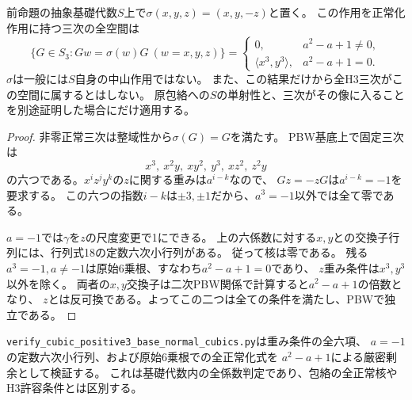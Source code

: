 \begin{proposition}\label{prop:h3-positive3-base-normal-cubics}
前命題の抽象基礎代数$S$上で$\sigma(x,y,z)=(x,y,-z)$と置く。
この作用を正常化作用に持つ三次の全空間は
\[
 \{G\in S_3:Gw=\sigma(w)G\ (w=x,y,z)\}
 =\begin{cases}
 0,&a^2-a+1\ne0,\\
 \langle x^3,y^3\rangle,&a^2-a+1=0.
 \end{cases}
\]
$\sigma$は一般には$S$自身の中山作用ではない。
また、この結果だけから全H3三次がこの空間に属するとはしない。
原包絡への$S$の単射性と、三次がその像に入ることを別途証明した場合にだけ適用する。
\end{proposition}
\begin{proof}
非零正常三次は整域性から$\sigma(G)=G$を満たす。
PBW基底上で固定三次は
\[
 x^3,\ x^2y,\ xy^2,\ y^3,\ xz^2,\ z^2y
\]
の六つである。$x^iz^jy^k$の$z$に関する重みは$a^{i-k}$なので、
$Gz=-zG$は$a^{i-k}=-1$を要求する。
この六つの指数$i-k$は$\pm3,\pm1$だから、$a^3=-1$以外では全て零である。

$a=-1$では$\gamma$を$z$の尺度変更で1にできる。
上の六係数に対する$x,y$との交換子行列には、行列式18の定数六次小行列がある。
従って核は零である。
残る$a^3=-1,a\ne-1$は原始6乗根、すなわち$a^2-a+1=0$であり、
$z$重み条件は$x^3,y^3$以外を除く。
両者の$x,y$交換子は二次PBW関係で計算すると$a^2-a+1$の倍数となり、
$z$とは反可換である。よってこの二つは全ての条件を満たし、PBWで独立である。
\end{proof}

\texttt{verify\_cubic\_positive3\_base\_normal\_cubics.py}は重み条件の全六項、
$a=-1$の定数六次小行列、および原始6乗根での全正常化式を
$a^2-a+1$による厳密剰余として検証する。
これは基礎代数内の全係数判定であり、包絡の全正常核やH3許容条件とは区別する。
